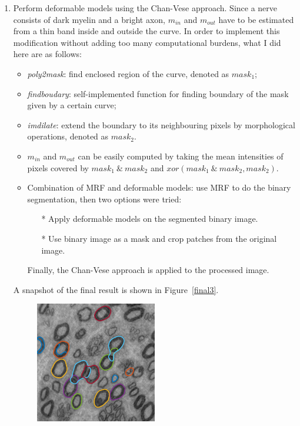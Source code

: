 \documentclass[a4paper]{article}
\begin{document}
\begin{enumerate}
\item Perform deformable models using the Chan-Vese approach. Since a nerve consists of dark myelin and a bright axon, $m_{in}$ and $m_{out}$ have to be estimated from a thin band inside and outside the curve. In order to implement this modification without adding too many computational burdens, what I did here are as follows:
\begin{itemize}
    \item \textit{poly2mask}: find enclosed region of the curve, denoted as $mask_1$;
\item \textit{findboudary}: self-implemented function for finding boundary of the mask given by a certain curve;
\item \textit{imdilate}: extend the boundary to its neighbouring pixels by morphological operations, denoted as $mask_2$.
\item $m_{in}$ and $m_{out}$ can be easily computed by taking the mean intensities of pixels covered by $mask_1\ \&\ mask_2$ and $xor(mask_1\ \&\ mask_2, mask_2)$.
\item Combination of MRF and deformable models: use MRF to do the binary segmentation, then two options were tried:
\begin{itemize}
	\item[*] Apply deformable models on the segmented binary image.
	\item[*] Use binary image as a mask and crop patches from the original image.
\end{itemize}
    Finally, the Chan-Vese approach is applied to the processed image.
\end{itemize}
A snapshot of the final result is shown in Figure~\ref{final3}.
	\begin{figure}[!b]
	\centering
	\includegraphics[width=0.5\textwidth]{./figures/257.png}

\end{figure}
\end{enumerate}
\end{document}
